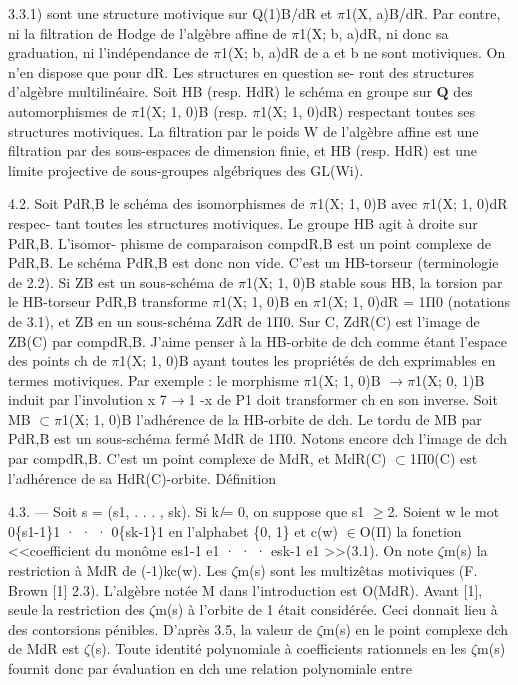 \documentclass[11pt]{article}
\begin{document}
3.3.1) sont une structure motivique sur Q(1)B/dR et \(\pi\)1(X, a)B/dR. Par contre, ni la filtration de Hodge de l’algèbre affine de \(\pi\)1(X; b, a)dR, ni donc sa graduation, ni l’indépendance de \(\pi\)1(X; b, a)dR de a et b ne sont motiviques. On n’en dispose que pour dR. Les structures en question se- ront des structures d’algèbre multilinéaire. Soit HB (resp. HdR) le schéma en groupe sur \(\mathbf Q\) des automorphismes de \(\pi\)1(X; 1, 0)B (resp. \(\pi\)1(X; 1, 0)dR) respectant toutes ses structures motiviques. La filtration par le poids W de l’algèbre affine est une filtration par des sous-espaces de dimension finie, et HB (resp. HdR) est une limite projective de sous-groupes algébriques des GL(Wi). 

4.2. Soit PdR,B le schéma des isomorphismes de \(\pi\)1(X; 1, 0)B avec \(\pi\)1(X; 1, 0)dR respec- tant toutes les structures motiviques. Le groupe HB agit à droite sur PdR,B. L’isomor- phisme de comparaison compdR,B est un point complexe de PdR,B. Le schéma PdR,B est donc non vide. C’est un HB-torseur (terminologie de 2.2). Si ZB est un sous-schéma de \(\pi\)1(X; 1, 0)B stable sous HB, la torsion par le HB-torseur PdR,B transforme \(\pi\)1(X; 1, 0)B en \(\pi\)1(X; 1, 0)dR = 1Π0 (notations de 3.1), et ZB en un sous-schéma ZdR de 1Π0. Sur C, ZdR(C) est l’image de ZB(C) par compdR,B. J’aime penser à la HB-orbite de dch comme étant l’espace des points ch de \(\pi\)1(X; 1, 0)B ayant toutes les propriétés de dch exprimables en termes motiviques. Par exemple : le morphisme \(\pi\)1(X; 1, 0)B \(\to\)\(\pi\)1(X; 0, 1)B induit par l’involution x 7\(\to\)1 -x de P1 doit transformer ch en son inverse. Soit MB \(\subset\)\(\pi\)1(X; 1, 0)B l’adhérence de la HB-orbite de dch. Le tordu de MB par PdR,B est un sous-schéma fermé MdR de 1Π0. Notons encore dch l’image de dch par compdR,B. C’est un point complexe de MdR, et MdR(C) \(\subset\)1Π0(C) est l’adhérence de sa HdR(C)-orbite. Définition 

4.3. --- Soit s = (s1, . . . , sk). Si k ̸= 0, on suppose que s1 \(\ge\)2. Soient w le mot 0\{s1-1\}1 · · · 0\{sk-1\}1 en l’alphabet \{0, 1\} et c(w) \(\in\)O(Π) la fonction <<coefficient du monôme es1-1 e1 · · · esk-1 e1 >>(3.1). On note \(\zeta\)m(s) la restriction à MdR de (-1)kc(w). Les \(\zeta\)m(s) sont les multizêtas motiviques (F. Brown [1] 2.3). L’algèbre notée M dans l’introduction est O(MdR). Avant [1], seule la restriction des \(\zeta\)m(s) à l’orbite de 1 était considérée. Ceci donnait lieu à des contorsions pénibles. D’après 3.5, la valeur de \(\zeta\)m(s) en le point complexe dch de MdR est \(\zeta\)(s). Toute identité polynomiale à coefficients rationnels en les \(\zeta\)m(s) fournit donc par évaluation en dch une relation polynomiale entre
\end{document}
